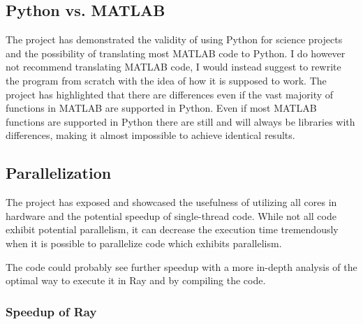 \documentclass[12pt, a4paper]{article}
\begin{document}
\subsection{Python vs. MATLAB}

The project has demonstrated the validity of using Python for science projects and the possibility of translating most MATLAB code to Python.
I do however not recommend translating MATLAB code, I would instead suggest to rewrite the program from scratch with the idea of how it is supposed to work.
The project has highlighted that there are differences even if the vast majority of functions in MATLAB are supported in Python.
Even if most MATLAB functions are supported in Python there are still and will always be libraries with differences, making it almost impossible to achieve identical results.

\subsection{Parallelization}

The project has exposed and showcased the usefulness of utilizing all cores in hardware and the potential speedup of single-thread code.
While not all code exhibit potential parallelism, it can decrease the execution time tremendously when it is possible to parallelize code which exhibits parallelism.

The code could probably see further speedup with a more in-depth analysis of the optimal way to execute it in Ray and by compiling the code.

\subsubsection{Speedup of Ray}\label{RaySpeedup}
\end{document}
